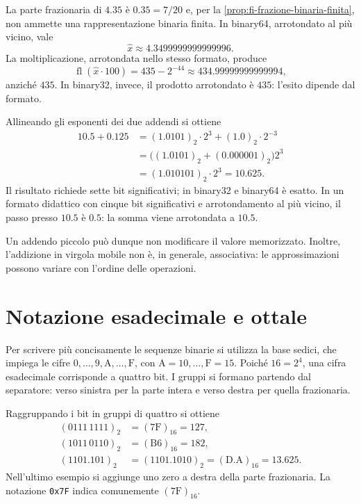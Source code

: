 \begin{example}
\label{ex:fi-arrotondamento-prodotto}
La parte frazionaria di \(4.35\) è \(0.35=7/20\) e, per la
\cref{prop:fi-frazione-binaria-finita}, non ammette una
rappresentazione binaria finita.
In binary64, arrotondato al più vicino, vale
\[
  \widehat{x}\approx4.3499999999999996.
\]
La moltiplicazione, arrotondata nello stesso formato, produce
\[
  \operatorname{fl}(\widehat{x}\cdot100)
  =435-2^{-44}\approx434.99999999999994,
\]
anziché \(435\). In binary32, invece, il prodotto arrotondato
è \(435\): l'esito dipende dal formato.
\end{example}

\begin{example}
Allineando gli esponenti dei due addendi si ottiene
\begin{align*}
  10.5+0.125
    &=(1.0101)_2\cdot2^3+(1.0)_2\cdot2^{-3}\\
    &=\bigl((1.0101)_2+(0.000001)_2\bigr)2^3\\
    &=(1.010101)_2\cdot2^3=10.625.
\end{align*}
Il risultato richiede sette bit significativi; in binary32 e binary64
è esatto. In un formato didattico con cinque bit significativi e
arrotondamento al più vicino, il passo presso \(10.5\) è \(0.5\):
la somma viene arrotondata a \(10.5\).
\end{example}

Un addendo piccolo può dunque non modificare il valore memorizzato.
Inoltre, l'addizione in virgola mobile non è, in generale, associativa:
le approssimazioni possono variare con l'ordine delle operazioni.

\section{Notazione esadecimale e ottale}
\label{sec:fi-esadecimale-ottale}

Per scrivere più concisamente le sequenze binarie si utilizza la
base sedici, che impiega le cifre
\(0,\ldots,9,\mathrm{A},\ldots,\mathrm{F}\),
con \(\mathrm{A}=10,\ldots,\mathrm{F}=15\). Poiché \(16=2^4\),
una cifra esadecimale corrisponde a quattro bit. I gruppi si formano
partendo dal separatore: verso sinistra per la parte intera e verso
destra per quella frazionaria.

\begin{example}
Raggruppando i bit in gruppi di quattro si ottiene
\begin{align*}
  (0111\,1111)_2&=(\mathrm{7F})_{16}=127,\\
  (1011\,0110)_2&=(\mathrm{B6})_{16}=182,\\
  (1101.101)_2&=(1101.1010)_2=(\mathrm{D.A})_{16}=13.625.
\end{align*}
Nell'ultimo esempio si aggiunge uno zero a destra della parte
frazionaria. La notazione \texttt{0x7F} indica comunemente
\((\mathrm{7F})_{16}\).
\end{example}

